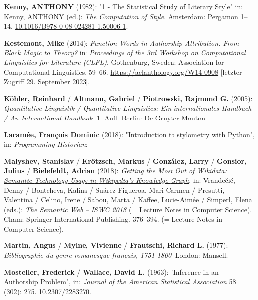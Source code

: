 \documentclass[
  12pt,
  letterpaper,
]{classicthesis}
\newlength{\cslhangindent}
\newenvironment{CSLReferences}[2] %
 {\begin{list}{}{%
  \setlength{\itemindent}{0pt}
  \setlength{\leftmargin}{0pt}
  \setlength{\parsep}{0pt}
  \ifodd #1
   \setlength{\leftmargin}{\cslhangindent}
   \setlength{\itemindent}{-1\cslhangindent}
  \fi
  \setlength{\itemsep}{#2\baselineskip}}}
 {\end{list}}
\begin{document}
\begin{CSLReferences}{1}{0}
\textbf{Kenny, ANTHONY} (1982): "1 - {The} {Statistical} {Study} of
{Literary} {Style}" in: Kenny, ANTHONY (ed.): \emph{The {Computation} of
{Style}}. Amsterdam: Pergamon 1--14.
\href{https://doi.org/10.1016/B978-0-08-024281-1.50006-1}{10.1016/B978-0-08-024281-1.50006-1}.

\textbf{Kestemont, Mike} (2014): \emph{Function {Words} in {Authorship}
{Attribution}. {From} {Black} {Magic} to {Theory}?} in:
\emph{Proceedings of the 3rd {Workshop} on {Computational} {Linguistics}
for {Literature} ({CLFL})}. Gothenburg, Sweden: Association for
Computational Linguistics. 59--66.
\url{https://aclanthology.org/W14-0908} {[}letzter Zugriff 29. September
2023{]}.

\textbf{Köhler, Reinhard} / \textbf{Altmann, Gabriel} /
\textbf{Piotrowski, Rajmund G.} (2005): \emph{Quantitative {Linguistik}
/ {Quantitative} {Linguistics}: {Ein} internationales {Handbuch} / {An}
{International} {Handbook}}. 1. Aufl. Berlin: De Gruyter Mouton.

\textbf{Laramée, François Dominic} (2018):
"\href{https://programminghistorian.org/en/lessons/introduction-to-stylometry-with-python}{Introduction
to stylometry with {Python}}", in: \emph{Programming Historian}:

\textbf{Malyshev, Stanislav} / \textbf{Krötzsch, Markus} /
\textbf{González, Larry} / \textbf{Gonsior, Julius} /
\textbf{Bielefeldt, Adrian} (2018):
\emph{\href{https://doi.org/10.1007/978-3-030-00668-6_23}{Getting the
{Most} {Out} of {Wikidata}: {Semantic} {Technology} {Usage} in
{Wikipedia}'s {Knowledge} {Graph}}}. in: Vrandečić, Denny / Bontcheva,
Kalina / Suárez-Figueroa, Mari Carmen / Presutti, Valentina / Celino,
Irene / Sabou, Marta / Kaffee, Lucie-Aimée / Simperl, Elena (eds.):
\emph{The {Semantic} {Web} -- {ISWC} 2018} (= Lecture {Notes} in
{Computer} {Science}). Cham: Springer International Publishing.
376--394. (= Lecture {Notes} in {Computer} {Science}).

\textbf{Martin, Angus} / \textbf{Mylne, Vivienne} / \textbf{Frautschi,
Richard L.} (1977): \emph{Bibliographie du genre romanesque français,
1751-1800}. London: Mansell.

\textbf{Mosteller, Frederick} / \textbf{Wallace, David L.} (1963):
"Inference in an {Authorship} {Problem}", in: \emph{Journal of the
American Statistical Association} 58 (302): 275.
\href{https://doi.org/10.2307/2283270}{10.2307/2283270}.


\end{CSLReferences}
\end{document}
